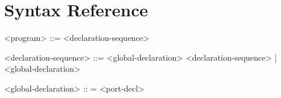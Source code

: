 \chapter{Syntax Reference} \label{ap:a}


\begin{grammar}

<program> ::= <declaration-sequence>

<declaration-sequence> ::= <global-declaration> <declaration-sequence> | <global-declaration>

<global-declaration> :: = 
<port-decl>

%

\end{grammar}

